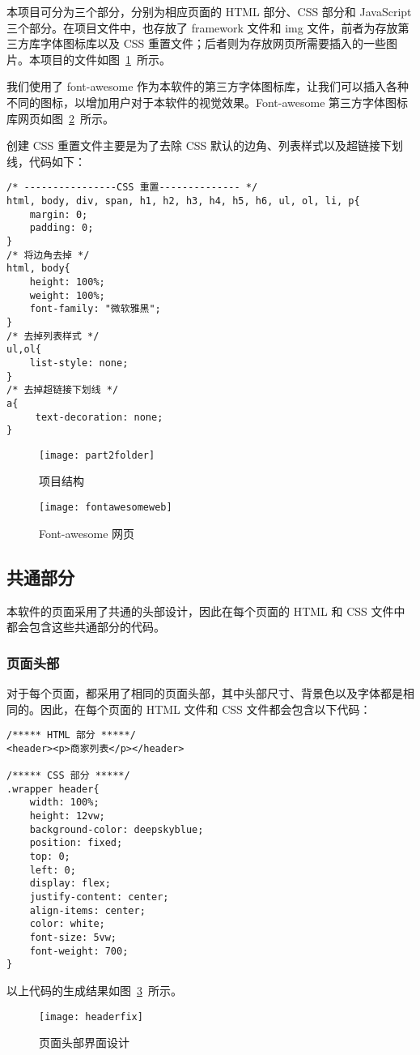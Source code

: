 本项目可分为三个部分，分别为相应页面的 HTML 部分、CSS 部分和 JavaScript 三个部分。在项目文件中，也存放了 framework 文件和 img 文件，前者为存放第三方库字体图标库以及 CSS 重置文件；后者则为存放网页所需要插入的一些图片。本项目的文件如图~\ref{fig:part2folder}~所示。

我们使用了 font-awesome 作为本软件的第三方字体图标库，让我们可以插入各种不同的图标，以增加用户对于本软件的视觉效果。Font-awesome 第三方字体图标库网页如图~\ref{fig:fontawesomeweb}~所示。

创建 CSS 重置文件主要是为了去除 CSS 默认的边角、列表样式以及超链接下划线，代码如下：
\begin{lstlisting}[basicstyle=\footnotesize]
/* ----------------CSS 重置-------------- */
html, body, div, span, h1, h2, h3, h4, h5, h6, ul, ol, li, p{
    margin: 0;
    padding: 0;
}
/* 将边角去掉 */
html, body{
    height: 100%;
    weight: 100%;
    font-family: "微软雅黑";
}
/* 去掉列表样式 */
ul,ol{
    list-style: none;
}
/* 去掉超链接下划线 */
a{
     text-decoration: none;
}
\end{lstlisting}
\begin{figure}[htbp]
    \centering
    \texttt{[image: part2folder]}
    \caption{项目结构}\label{fig:part2folder}
    \vspace{\baselineskip}
\end{figure}
\begin{figure}[htbp]
    \centering
    \texttt{[image: fontawesomeweb]}
    \caption{Font-awesome 网页}\label{fig:fontawesomeweb}
    \vspace{\baselineskip}
\end{figure}

\subsection{共通部分}
本软件的页面采用了共通的头部设计，因此在每个页面的 HTML 和 CSS 文件中都会包含这些共通部分的代码。
\subsubsection{页面头部}
对于每个页面，都采用了相同的页面头部，其中头部尺寸、背景色以及字体都是相同的。因此，在每个页面的 HTML 文件和 CSS 文件都会包含以下代码：
\begin{lstlisting}[basicstyle=\footnotesize]
/***** HTML 部分 *****/
<header><p>商家列表</p></header>

/***** CSS 部分 *****/
.wrapper header{
	width: 100%;
	height: 12vw;
	background-color: deepskyblue;
	position: fixed;
	top: 0;
	left: 0;
	display: flex;
	justify-content: center;
	align-items: center;
	color: white;
	font-size: 5vw;
	font-weight: 700;
}
\end{lstlisting}    
以上代码的生成结果如图~\ref{fig:headerfix}~所示。
\begin{figure}[htbp]
    \centering
    \texttt{[image: headerfix]}
    \caption{页面头部界面设计}\label{fig:headerfix}
    \vspace{\baselineskip}
\end{figure}

